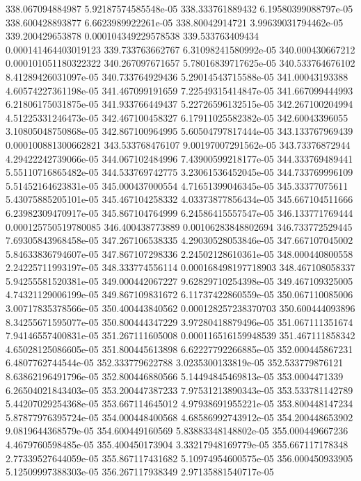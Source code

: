 {338.067094884987 5.92187574585548e-05
338.333761889432 6.19580399088797e-05
338.600428893877 6.6623989922261e-05
338.80042914721 3.99639031794462e-05
339.200429653878 0.000104349229578538
339.533763409434 0.000141464403019123
339.733763662767 6.31098241580992e-05
340.000430667212 0.000101051180322322
340.267097671657 5.78016839717625e-05
340.533764676102 8.41289426031097e-05
340.733764929436 5.29014543715588e-05
341.00043193388 4.60574227361198e-05
341.467099191659 7.22549315414847e-05
341.667099444993 6.21806175031875e-05
341.933766449437 5.22726596132515e-05
342.267100204994 4.51225331246473e-05
342.467100458327 6.17911025582382e-05
342.60043396055 3.10805048750868e-05
342.867100964995 5.60504797817444e-05
343.133767969439 0.000100881300662821
343.533768476107 9.00197007291562e-05
343.73376872944 4.29422242739066e-05
344.067102484996 7.43900599218177e-05
344.333769489441 5.55110716865482e-05
344.533769742775 3.23061536452045e-05
344.733769996109 5.51452164623831e-05
345.000437000554 4.71651399046345e-05
345.33377075611 5.43075885205101e-05
345.467104258332 4.03373877856434e-05
345.667104511666 6.23982309470917e-05
345.867104764999 6.24586415557547e-05
346.133771769444 0.000125750519780085
346.400438773889 0.00106283848802694
346.733772529445 7.69305843968458e-05
347.267106538335 4.29030528053846e-05
347.667107045002 5.84633836794607e-05
347.867107298336 2.24502128610361e-05
348.000440800558 2.24225711993197e-05
348.333774556114 0.000168498197718903
348.467108058337 5.94255581520381e-05
349.000442067227 9.62829710254398e-05
349.467109325005 4.74321129006199e-05
349.867109831672 6.11737422860559e-05
350.067110085006 3.00717835378566e-05
350.400443840562 0.000128257238370703
350.600444093896 8.34255671595077e-05
350.800444347229 3.97280418879496e-05
351.067111351674 7.94146557400831e-05
351.267111605008 0.000116516159948539
351.467111858342 4.65028125086605e-05
351.800445613898 6.62227792266885e-05
352.000445867231 6.4807762744544e-05
352.333779622788 3.0235300133819e-05
352.533779876121 8.63862196491796e-05
352.800446880566 5.14494845469813e-05
353.0004471339 6.26504021843403e-05
353.200447387233 7.97531213890343e-05
353.533781142789 5.44207029254368e-05
353.667114645012 4.97938691955221e-05
353.800448147234 5.87877976395724e-05
354.000448400568 4.68586992743912e-05
354.200448653902 9.0819644368579e-05
354.600449160569 5.83883348148802e-05
355.000449667236 4.4679760598485e-05
355.400450173904 3.33217948169779e-05
355.667117178348 2.77339527644059e-05
355.867117431682 5.10974954600575e-05
356.000450933905 5.12509997388303e-05
356.267117938349 2.97135881540717e-05
}
